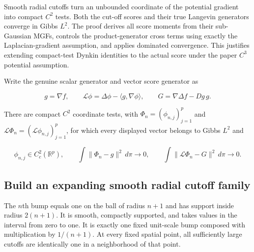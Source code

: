 \documentclass[11pt,a4paper]{report}
\begin{document}
Smooth radial cutoffs turn an unbounded coordinate of the potential gradient into compact \(C^{2}\) tests. Both the cut-off scores and their true Langevin generators converge in Gibbs \(L^{2}\). The proof derives all score moments from their sub-Gaussian MGFs, controls the product-generator cross terms using exactly the Laplacian-gradient assumption, and applies dominated convergence. This justifies extending compact-test Dynkin identities to the actual score under the paper \(C^{3}\) potential assumption.



Write the genuine scalar generator and vector score generator as

\[g=\nabla f,\qquad \mathcal L\phi=\Delta\phi-\langle g,\nabla\phi\rangle,\qquad G=\nabla\Delta f-Dg\,g.\]

There are compact \(C^{2}\) coordinate tests, with \(\Phi_n=(\phi_{n,j})_{j=1}^p\) and \(\mathcal L\Phi_n=(\mathcal L\phi_{n,j})_{j=1}^p\), for which every displayed vector belongs to Gibbs \(L^{2}\) and

\[\phi_{n,j}\in C_c^2(\mathbb R^p),\qquad \int\!\|\Phi_n-g\|^2\,d\pi\longrightarrow0,\qquad \int\!\|\mathcal L\Phi_n-G\|^2\,d\pi\longrightarrow0.\]\subsection{\texorpdfstring{Build an expanding smooth radial cutoff family}{Build an expanding smooth radial cutoff family}}
\label{report-step-AverageLMC-GibbsScoreCutoff-lean-1}


The \(n\)th bump equals one on the ball of radius \(n+1\) and has support inside radius \(2(n+1)\). It is smooth, compactly supported, and takes values in the interval from zero to one. It is exactly one fixed unit-scale bump composed with multiplication by \(1/(n+1)\). At every fixed spatial point, all sufficiently large cutoffs are identically one in a neighborhood of that point.
\end{document}
